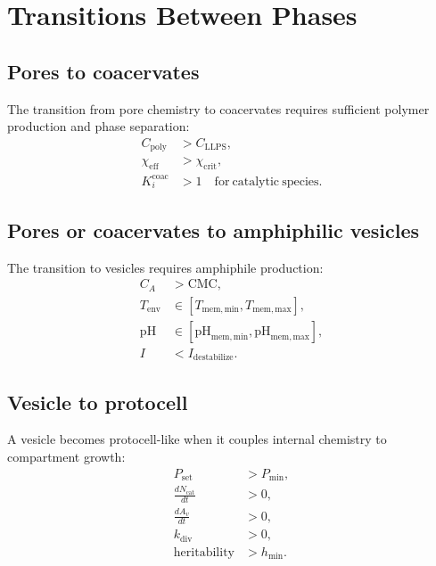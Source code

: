 \documentclass[11pt]{article}
\begin{document}
\section{Transitions Between Phases}

\subsection{Pores to coacervates}

The transition from pore chemistry to coacervates requires sufficient polymer
production and phase separation:
\begin{align}
    C_{\mathrm{poly}} &> C_{\mathrm{LLPS}}, \\
    \chi_{\mathrm{eff}} &> \chi_{\mathrm{crit}}, \\
    K_i^{\mathrm{coac}} &> 1
    \quad \mathrm{for\ catalytic\ species}.
\end{align}

\subsection{Pores or coacervates to amphiphilic vesicles}

The transition to vesicles requires amphiphile production:
\begin{align}
    C_A &> \mathrm{CMC}, \\
    T_{\mathrm{env}} &\in [T_{\mathrm{mem,min}},T_{\mathrm{mem,max}}], \\
    \mathrm{pH} &\in [\mathrm{pH}_{\mathrm{mem,min}},
                     \mathrm{pH}_{\mathrm{mem,max}}], \\
    I &< I_{\mathrm{destabilize}}.
\end{align}

\subsection{Vesicle to protocell}

A vesicle becomes protocell-like when it couples internal chemistry to
compartment growth:
\begin{align}
    P_{\mathrm{set}} &> P_{\mathrm{min}}, \\
    \frac{dN_{\mathrm{cat}}}{dt} &> 0, \\
    \frac{dA_v}{dt} &> 0, \\
    k_{\mathrm{div}} &> 0, \\
    \mathrm{heritability} &> h_{\mathrm{min}}.
\end{align}
\end{document}

